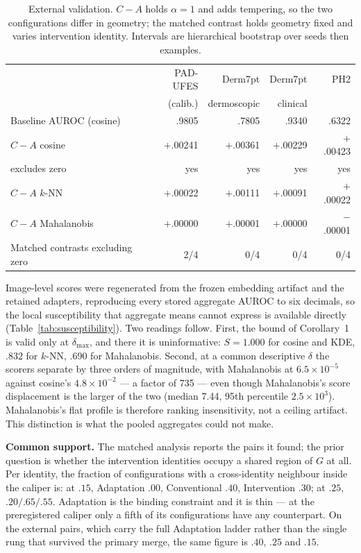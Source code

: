 \documentclass[11pt,a4paper]{article}
\begin{document}
\begin{table}[t]
\centering
\caption{External validation. $C-A$ holds $\alpha=1$ and adds tempering, so the two configurations differ in geometry; the matched contrast holds geometry fixed and varies intervention identity. Intervals are hierarchical bootstrap over seeds then examples.}
\label{tab:external}
\small
\begin{tabular}{lrrrr}
\toprule
& PAD-UFES & Derm7pt & Derm7pt & PH2\\
& (calib.) & dermoscopic & clinical & \\
\midrule
Baseline AUROC (cosine) & .9805 & .7805 & .9340 & .6322\\
\midrule
$C-A$ cosine & $+$.00241 & $+$.00361 & $+$.00229 & $+$.00423\\
\quad excludes zero & yes & yes & yes & yes\\
$C-A$ $k$-NN & $+$.00022 & $+$.00111 & $+$.00091 & $+$.00022\\
$C-A$ Mahalanobis & $+$.00000 & $+$.00001 & $+$.00000 & $-$.00001\\
\midrule
Matched contrasts excluding zero & 2/4 & 0/4 & 0/4 & 0/4\\
\bottomrule
\end{tabular}
\end{table}

Image-level scores were regenerated from the frozen embedding artifact and the retained adapters, reproducing every stored aggregate AUROC to six decimals, so the local susceptibility that aggregate means cannot express is available directly (Table~\ref{tab:susceptibility}). Two readings follow. First, the bound of Corollary~1 is valid only at $\delta_{\max}$, and there it is uninformative: $S=1.000$ for cosine and KDE, $.832$ for $k$-NN, $.690$ for Mahalanobis. Second, at a common descriptive $\delta$ the scorers separate by three orders of magnitude, with Mahalanobis at $6.5\times10^{-5}$ against cosine's $4.8\times10^{-2}$ --- a factor of 735 --- even though Mahalanobis's score displacement is the larger of the two (median 7.44, 95th percentile $2.5\times10^{3}$). Mahalanobis's flat profile is therefore ranking insensitivity, not a ceiling artifact. This distinction is what the pooled aggregates could not make.

\textbf{Common support.} The matched analysis reports the pairs it found; the
prior question is whether the intervention identities occupy a shared region of
$G$ at all. Per identity, the fraction of configurations with a cross-identity
neighbour inside the caliper is: at $.15$, Adaptation $.00$, Conventional $.40$,
Intervention $.30$; at $.25$, $.20/.65/.55$. Adaptation is the binding
constraint and it is thin --- at the preregistered caliper only a fifth of its
configurations have any counterpart. On the external pairs, which carry the full
Adaptation ladder rather than the single rung that survived the primary merge,
the same figure is $.40$, $.25$ and $.15$.
\end{document}
